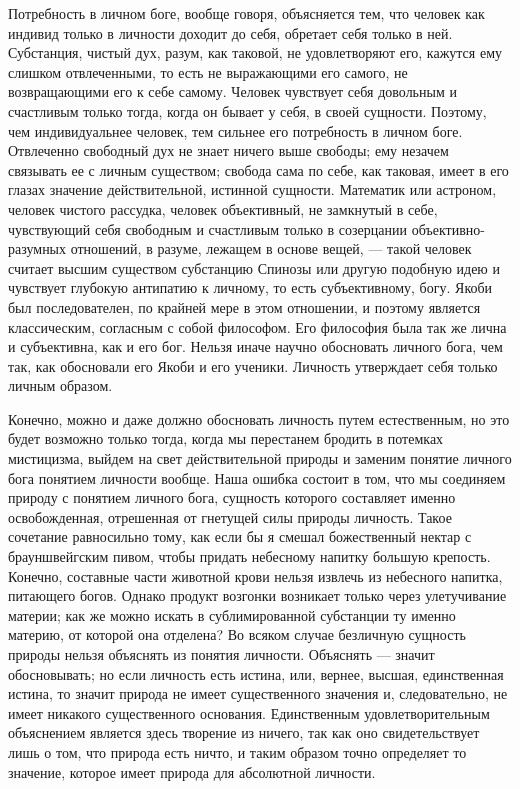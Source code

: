 \documentclass[12pt,oneside]{book}
\begin{document}
Потребность в личном боге, вообще говоря, объясняется тем, что человек как индивид только в личности доходит до себя, обретает себя только в ней. Субстанция, чистый дух, разум, как таковой, не удовлетворяют его, кажутся ему слишком отвлеченными, то есть не выражающими его самого, не возвращающими его к себе самому. Человек чувствует себя довольным и счастливым только тогда, когда он бывает у себя, в своей сущности. Поэтому, чем индивидуальнее человек, тем сильнее его потребность в личном боге. Отвлеченно свободный дух не знает ничего выше свободы; ему незачем связывать ее с личным существом; свобода сама по себе, как таковая, имеет в его глазах значение действительной, истинной сущности. Математик или астроном, человек чистого рассудка, человек объективный, не замкнутый в себе, чувствующий себя свободным и счастливым только в созерцании объективно-разумных отношений, в разуме, лежащем в основе вещей, --- такой человек считает высшим существом субстанцию Спинозы или другую подобную идею и чувствует глубокую антипатию к личному, то есть субъективному, богу. Якоби был последователен, по крайней мере в этом отношении, и поэтому является классическим, согласным с собой философом. Его философия была так же лична и субъективна, как и его бог. Нельзя иначе научно обосновать личного бога, чем так, как обосновали его Якоби и его ученики. Личность утверждает себя только личным образом.

Конечно, можно и даже должно обосновать личность путем естественным, но это будет возможно только тогда, когда мы перестанем бродить в потемках мистицизма, выйдем на свет действительной природы и заменим понятие личного бога понятием личности вообще. Наша ошибка состоит в том, что мы соединяем природу с понятием личного бога, сущность которого составляет именно освобожденная, отрешенная от гнетущей силы природы личность. Такое сочетание равносильно тому, как если бы я смешал божественный нектар с брауншвейгским пивом, чтобы придать небесному напитку большую крепость. Конечно, составные части животной крови нельзя извлечь из небесного напитка, питающего богов. Однако продукт возгонки возникает только через улетучивание материи; как же можно искать в сублимированной субстанции ту именно материю, от которой она отделена? Во всяком случае безличную сущность природы нельзя объяснять из понятия личности. Объяснять --- значит обосновывать; но если личность есть истина, или, вернее, высшая, единственная истина, то значит природа не имеет существенного значения и, следовательно, не имеет никакого существенного основания. Единственным удовлетворительным объяснением является здесь творение из ничего, так как оно свидетельствует лишь о том, что природа есть ничто, и таким образом точно определяет то значение, которое имеет природа для абсолютной личности.
\end{document}
